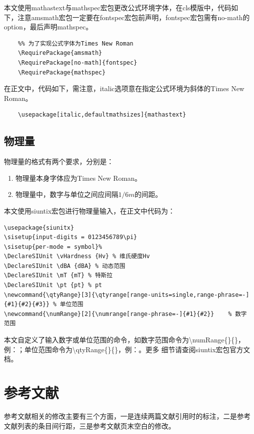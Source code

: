 本文使用mathastext与mathspec宏包更改公式环境字体，在cls模版中，代码如下，注意amsmath宏包一定要在fontspec宏包前声明，fontspec宏包需有no-math的option，最后声明mathspec。
\begin{lstlisting}
    %% 为了实现公式字体为Times New Roman
    \RequirePackage{amsmath}
    \RequirePackage[no-math]{fontspec}
    \RequirePackage{mathspec}
\end{lstlisting}
在正文中，代码如下，需注意，italic选项意在指定公式环境为斜体的Times New Roman。
\begin{lstlisting}
    \usepackage[italic,defaultmathsizes]{mathastext}
\end{lstlisting}
\subsection{物理量}
物理量的格式有两个要求，分别是：
\begin{enumerate}
    \item 物理量本身字体应为Times New Roman。
    \item 物理量中，数字与单位之间应间隔$1/6m$的间距。
\end{enumerate}

本文使用siuntix宏包进行物理量输入，在正文中代码为：
\begin{lstlisting}
\usepackage{siunitx}
\sisetup{input-digits = 0123456789\pi}
\sisetup{per-mode = symbol}%
\DeclareSIUnit \vHardness {Hv} % 维氏硬度Hv
\DeclareSIUnit \dBA {dBA} % 动态范围
\DeclareSIUnit \mT {mT} % 特斯拉
\DeclareSIUnit \pt {pt} % pt
\newcommand{\qtyRange}[3]{\qtyrange[range-units=single,range-phrase=-]{#1}{#2}{#3}} % 单位范围
\newcommand{\numRange}[2]{\numrange[range-phrase=-]{#1}{#2}}	% 数字范围
\end{lstlisting}

本文自定义了输入数字或单位范围的命令，如数字范围命令为\textbackslash{}numRange\{\}\{\}，例：；单位范围命令为\textbackslash{}qtyRange\{\}\{\}，例：。更多
细节请查阅siuntix宏包官方文档。

\section{参考文献}
参考文献相关的修改主要有三个方面，一是连续两篇文献引用时的标注，二是参考文献列表的条目间行距，三是参考文献页末空白的修改。
